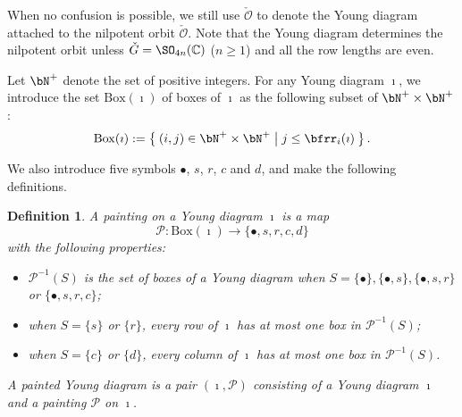 \documentclass[12pt,a4paper]{amsart}
\newcommand{\CO}{{\mathcal {O}}}
\newcommand{\CP}{{\mathcal {P}}}
\numberwithin{equation}{section}
\newtheorem{defn}[thm]{Definition}
\theoremstyle{remark}
\def\CP{\mathsf{CP}}
\begin{document}
When no confusion is possible, we still use $\check \CO$ to denote the Young diagram attached to the nilpotent orbit $\check \CO$. Note that the Young diagram determines the nilpotent orbit unless $\check G=\SO_{4n}(\C)$ ($n\geq 1$) and all the row lengths are even.

Let $\bN^+$ denote the set of positive integers. For any Young diagram $\imath$, we introduce the set $\mathrm{Box}(\imath)$ of
boxes of $\imath$ as the following subset of $\bN^+\times \bN^+$:
\[
  \mathrm{Box}(\imath):=\Set{(i,j)\in\bN^+\times \bN^+| j\leq \bfrr_i(\imath)}.
\]



\renewcommand{\CP}{\mathcal{P}} We also introduce five symbols $\bullet$, $s$,
$r$, $c$ and $d$, and make the following definitions.
\begin{defn}
  A painting on a Young diagram $\imath$ is a map
  \[
    \mathcal P: \mathrm{Box}(\imath) \rightarrow \{\bullet, s, r, c, d \}
  \]
  with the following properties:
  \begin{itemize}
    \item $\mathcal P^{-1}(S)$ is the set of boxes of a Young diagram when
          $S=\{\bullet\}, \{\bullet, s \}, \{\bullet, s, r\}$ or
          $\{\bullet, s, r, c \} $;
    \item when $S=\{s\}$ or $ \{r\}$, every row of $\imath$ has at most one box
          in $\CP^{-1}(S)$;
    \item when $S=\{c\}$ or $ \{d \}$, every column of $\imath$ has at most one
          box in $\CP^{-1}(S)$.
  \end{itemize}
A painted Young diagram is a pair $(\imath, \CP)$ consisting of a Young diagram $\imath$ and a painting $\CP$ on $\imath$.
\end{defn}
\end{document}
